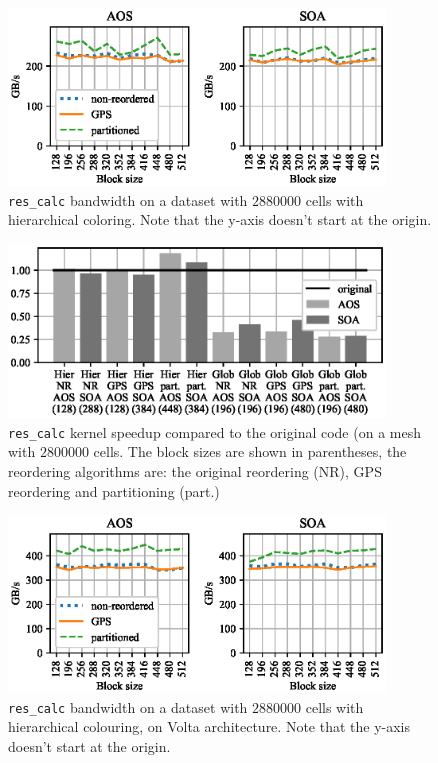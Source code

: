 \begin{figure}[Htbp]
\centering
\includegraphics[width=10cm]{fig/airfoil_bw-vs-bs_hier_large.eps}
\caption{\texttt{res\_calc} bandwidth on a dataset with $2880000$ cells with
hierarchical coloring. Note that the y-axis doesn't start at the origin.}
\label{fig:airfoil_bw-vs-bs_hier_large}
\end{figure}

\begin{figure}[Htbp]
\centering
\includegraphics[width=10cm]{fig/airfoil_speedup_large.eps}
\caption{\texttt{res\_calc} kernel speedup compared to the original code (on 
a mesh with $2800000$ cells. The block sizes are shown in parentheses, the 
reordering algorithms are: the original reordering (NR), GPS reordering and 
partitioning (part.)}
\label{fig:airfoil_speedup_large}
\end{figure}



\begin{figure}[Htbp]
  \centering
  \includegraphics[width=10cm]{fig/airfoil_bw-vs-bs_hier_large_volta.eps}
  \caption{\texttt{res\_calc} bandwidth on a dataset with $2880000$ cells with
  hierarchical colouring, on Volta architecture. Note that the y-axis doesn't
  start at the origin.}
  \label{fig:airfoil_bw-vs-bs_hier_large_volta}
\end{figure}

